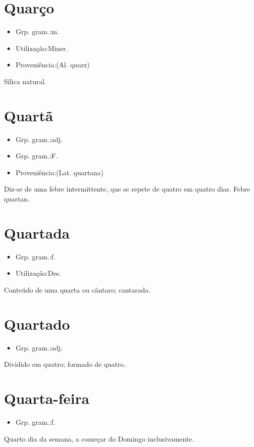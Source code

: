 \section{Quarço}
\begin{itemize}
\item {Grp. gram.:m.}
\end{itemize}
\begin{itemize}
\item {Utilização:Miner.}
\end{itemize}
\begin{itemize}
\item {Proveniência:(Al. \textunderscore quarz\textunderscore )}
\end{itemize}
Sílica natural.
\section{Quartã}
\begin{itemize}
\item {Grp. gram.:adj.}
\end{itemize}
\begin{itemize}
\item {Grp. gram.:F.}
\end{itemize}
\begin{itemize}
\item {Proveniência:(Lat. \textunderscore quartana\textunderscore )}
\end{itemize}
Diz-se de uma febre intermittente, que se repete de quatro em quatro dias.
Febre quartan.
\section{Quartada}
\begin{itemize}
\item {Grp. gram.:f.}
\end{itemize}
\begin{itemize}
\item {Utilização:Des.}
\end{itemize}
Conteúdo de uma quarta ou cântaro; cantarada.
\section{Quartado}
\begin{itemize}
\item {Grp. gram.:adj.}
\end{itemize}
Dividido em quatro; formado de quatro.
\section{Quarta-feira}
\begin{itemize}
\item {Grp. gram.:f.}
\end{itemize}
Quarto dia da semana, a começar do Domingo inclusivamente.
